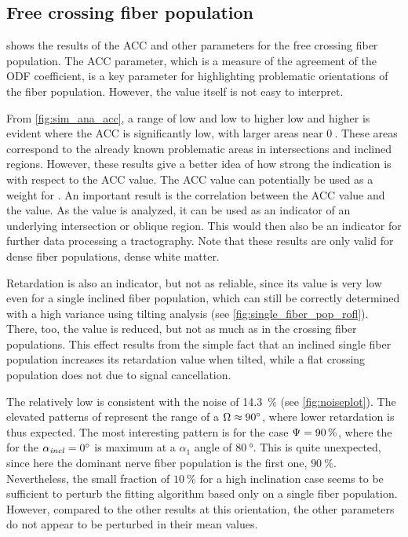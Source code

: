 \subsection{Free crossing fiber population}
 shows the results of the \ac{ACC} and other parameters for the free crossing fiber population.
The \ac{ACC} parameter, which is a measure of the agreement of the \ac{ODF} coefficient, is a key parameter for highlighting problematic orientations of the fiber population.
However, the value itself is not easy to interpret.
\par
%
From \ref{fig:sim_ana_acc}, a range of low \modelPsi{} and low \modelInc{} to higher low \modelPsi{} and higher \modelInc{} is evident where the \ac{ACC} is significantly low, with larger areas near $\SI{0}{}$.
These areas correspond to the already known problematic areas in intersections and inclined regions.
However, these results give a better idea of how strong the indication is with respect to the \ac{ACC} value.
The \ac{ACC} value can potentially be used as a weight for .
An important result is the correlation between the \ac{ACC} value and the \trel{} value.
As the \trel{} value is analyzed, it can be used as an indicator of an underlying intersection or oblique region.
This would then also be an indicator for further data processing \eg{} a tractography.
Note that these results are only valid for dense fiber populations, \ie{} dense white matter.
\par
%
Retardation is also an indicator, but not as reliable, since its value is very low even for a single inclined fiber population, which can still be correctly determined with a high variance using tilting analysis (see \cref{fig:single_fiber_pop_rofl}).
There, too, the \trel{} value is reduced, but not as much as in the crossing fiber populations.
This effect results from the simple fact that an inclined single fiber population increases its retardation value when tilted, while a flat crossing population does not due to signal cancellation.
\par
%
The relatively low \rvalue{} is consistent with the noise of \SI{14.3}{\percent} (see \cref{fig:noiseplot}).
The elevated patterns of \rvalue{} represent the range of a $\textnormal{$\Omega$} \approx \SI{90}{\degree}$, where lower retardation is thus expected.
The most interesting pattern is for the case $\textnormal{$\Psi$} = \SI{90}{\percent}$, where the \rvalue{} for the $\textnormal{$\alpha_{\mathit{incl}}$} = \SI{0}{\degree}$ is maximum at a $\alpha_1$  angle of $\SI{80}{\degree}$.
This is quite unexpected, since here the dominant nerve fiber population is the first one, \ie{} $\SI{90}{\percent}$.
Nevertheless, the small fraction of $\SI{10}{\percent}$ for a high inclination case seems to be sufficient to perturb the fitting algorithm based only on a single fiber population.
However, compared to the other results at this orientation, the other parameters do not appear to be perturbed in their mean values.
%
%
%
